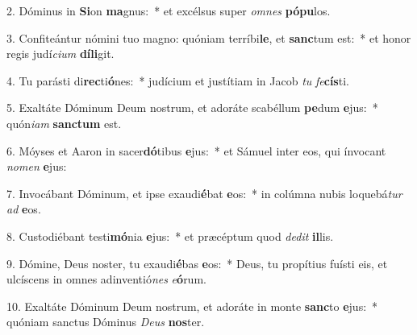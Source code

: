 2. Dóminus in \textbf{Si}on \textbf{ma}gnus:~*  et excélsus super \textit{om}\textit{nes} \textbf{pó}\textbf{pu}los.\

3. Confiteántur nómini tuo magno: quóniam terríbi\textbf{le}, et \textbf{sanc}tum est:~*  et honor regis judí\textit{ci}\textit{um} \textbf{dí}\textbf{li}git.\

4. Tu parásti di\textbf{rec}ti\textbf{ó}nes:~*  judícium et justítiam in Jacob \textit{tu} \textit{fe}\textbf{cís}ti.\

5. Exaltáte Dóminum Deum nostrum, et adoráte scabéllum \textbf{pe}dum \textbf{e}jus:~*  quón\textit{i}\textit{am} \textbf{sanc}\textbf{tum} est.\

6. Móyses et Aaron in sacer\textbf{dó}tibus \textbf{e}jus:~*  et Sámuel inter eos, qui ínvocant \textit{no}\textit{men} \textbf{e}jus:\

7. Invocábant Dóminum, et ipse exaudi\textbf{é}bat \textbf{e}os:~*  in colúmna nubis loquebá\textit{tur} \textit{ad} \textbf{e}os.\

8. Custodiébant testi\textbf{mó}nia \textbf{e}jus:~*  et præcéptum quod \textit{de}\textit{dit} \textbf{il}lis.\

9. Dómine, Deus noster, tu exaudi\textbf{é}bas \textbf{e}os:~*  Deus, tu propítius fuísti eis, et ulcíscens in omnes adinventió\textit{nes} \textit{e}\textbf{ó}rum.\

10. Exaltáte Dóminum Deum nostrum, et adoráte in monte \textbf{sanc}to \textbf{e}jus:~*  quóniam sanctus Dóminus \textit{De}\textit{us} \textbf{nos}ter.\

